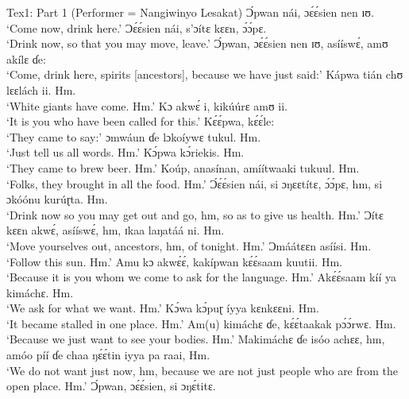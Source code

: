 \documentclass[output=paper,colorlinks,citecolor=brown]{langscibook}
\begin{document}
\ea Tex1: Part 1 (Performer = Nangiwinyo Lesakat)
    \ea    Ɔ́pwan nái, ɔɛ́ɛ́sien nen ɪʊ.\\
            `Come now, drink here.'
    \ex     Ɔɛ́ɛ́sien nái, s’ɔítɛ kɛɛn, ɔ́ɔ́pɛ. \\
            `Drink now, so that you may move, leave.'
    \ex     Ɔ́pwan, ɔɛ́ɛ́sien nen ɪʊ, asííswɛ́, amʊ akílɛ ɗe:\\
            `Come, drink here, spirits [ancestors], because we have just said:'
    \ex     Kápwa tián chʊ lɛɛlách ii. Hm.\\
            `White giants have come. Hm.' 
    \ex     Kɔ akwɛ́ i, kikúúrɛ amʊ ii. \\
            `It is you who have been called for this.'
    \ex     Kɛ́ɛ́pwa, kɛ́ɛ́le:\\
            `They came to say:'
    \ex     ɔmwáun ɗe lɔkoíywɛ tukul. Hm. \\
            `Just tell us all words. Hm.'
    \ex     Kɔ́pwa kɔ́riekis. Hm.\\
            `They came to brew beer. Hm.'
    \ex     Koúp, anasínan, amíítwaaki tukuul. Hm. \\
            `Folks, they brought in all the food. Hm.'
    \ex     Ɔ́ɛ́ɛ́sien nái, si ɔŋɛɛtítɛ, ɔ́ɔ́pɛ, hm, si ɔkóónu kurúɽta. Hm.\\
            `Drink now so you may get out and go, hm, so as to give us health. Hm.'
    \ex     Ɔítɛ kɛɛn akwɛ́, asííswɛ́, hm, ɪkaa laŋatáá ni. Hm. \\
            `Move yourselves out, ancestors, hm, of tonight. Hm.'
    \ex     Ɔmáátɛɛn asíísi. Hm.\\
            `Follow this sun. Hm.'
    \ex     Amu kɔ akwɛ́ɛ́, kakípwan kɛ́ɛ́saam kuutii. Hm.\\
            `Because it is you whom we come to ask for the language. Hm.'
    \ex     Akɛ́ɛ́saam kíí ya kimáchɛ. Hm.\\
            `We ask for what we want. Hm.'
    \ex     Kɔ́wa kɔ́puɽ íyya kɛnkɛɛni. Hm.\\
            `It became stalled in one place. Hm.'
    \ex     Am(u) kimáchɛ ɗe, kɛ́ɛ́taakak pɔ́ɔ́rwɛ. Hm.\\
            `Because we just want to see your bodies. Hm.'
    \ex     Makimáchɛ ɗe isóo achɛɛ, hm, amóo píí ɗe chaa ŋɛ́ɛ́tin iyya pa raai, Hm.\\
            `We do not want just now, hm, because we are not just people who are from the open place. Hm.'
    \ex     Ɔ́pwan, ɔɛ́ɛ́sien, si ɔŋɛ́titɛ.\\
\end{document}
